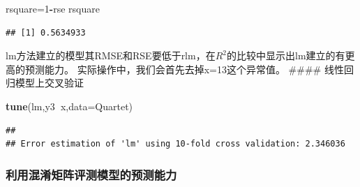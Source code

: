 \documentclass[
]{article}
\newenvironment{Shaded}{\begin{snugshade}}{\end{snugshade}}
\newcommand{\CommentTok}[1]{\textcolor[rgb]{0.56,0.35,0.01}{\textit{#1}}}
\newcommand{\DataTypeTok}[1]{\textcolor[rgb]{0.13,0.29,0.53}{#1}}
\newcommand{\DecValTok}[1]{\textcolor[rgb]{0.00,0.00,0.81}{#1}}
\newcommand{\KeywordTok}[1]{\textcolor[rgb]{0.13,0.29,0.53}{\textbf{#1}}}
\newcommand{\NormalTok}[1]{#1}
\newcommand{\OperatorTok}[1]{\textcolor[rgb]{0.81,0.36,0.00}{\textbf{#1}}}
\newcommand{\StringTok}[1]{\textcolor[rgb]{0.31,0.60,0.02}{#1}}
\begin{document}
\begin{Shaded}
\begin{Highlighting}[]
\NormalTok{rsquare=}\DecValTok{1}\OperatorTok{-}\NormalTok{rse}
\NormalTok{rsquare}
\end{Highlighting}
\end{Shaded}

\begin{verbatim}
## [1] 0.5634933
\end{verbatim}

lm方法建立的模型其RMSE和RSE要低于rlm，在\(R^2\)的比较中显示出lm建立的有更高的预测能力。
实际操作中，我们会首先去掉x=13这个异常值。 \#\#\#\#
线性回归模型上交叉验证

\begin{Shaded}
\begin{Highlighting}[]
\KeywordTok{tune}\NormalTok{(lm,y3}\OperatorTok{~}\NormalTok{x,}\DataTypeTok{data=}\NormalTok{Quartet)}
\end{Highlighting}
\end{Shaded}

\begin{verbatim}
## 
## Error estimation of 'lm' using 10-fold cross validation: 2.346036
\end{verbatim}

\hypertarget{ux5229ux7528ux6df7ux6dc6ux77e9ux9635ux8bc4ux6d4bux6a21ux578bux7684ux9884ux6d4bux80fdux529b}{%
\subsubsection{利用混淆矩阵评测模型的预测能力}\label{ux5229ux7528ux6df7ux6dc6ux77e9ux9635ux8bc4ux6d4bux6a21ux578bux7684ux9884ux6d4bux80fdux529b}}

\begin{Shaded}
\end{Shaded}
\end{document}
